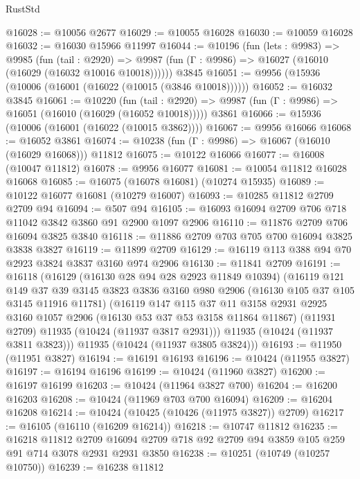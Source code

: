 \begin{lexlean}{RustStd}
\begin{coremodule}
@16028 := @10056 @2677
@16029 := @10055 @16028
@16030 := @10059 @16028
@16032 := @16030 @15966 @11997
@16044 := @10196
    (fun (lets : @9983) =>
    @9985
      (fun (tail : @2920) =>
      @9987 (fun (Γ : @9986) => @16027 (@16010 (@16029 (@16032 @10016 @10018))))))
    @3845
@16051 := @9956 (@15936 (@10006 (@16001 (@16022 (@10015 (@3846 @10018))))))
@16052 := @16032 @3845
@16061 := @10220
    (fun (tail : @2920) => @9987 (fun (Γ : @9986) => @16051 (@16010 (@16029 (@16052 @10018)))))
    @3861
@16066 := @15936 (@10006 (@16001 (@16022 (@10015 @3862))))
@16067 := @9956 @16066
@16068 := @16052 @3861
@16074 := @10238 (fun (Γ : @9986) => @16067 (@16010 (@16029 @16068))) @11812
@16075 := @10122 @16066
@16077 := @16008 (@10047 @11812)
@16078 := @9956 @16077
@16081 := @10054 @11812 @16028 @16068
@16085 := @16075 (@16078 @16081) (@10274 @15935)
@16089 := @10122 @16077 @16081 (@10279 @16007)
@16093 := @10285 @11812 @2709 @2709 @94
@16094 := @507 @94
@16105 := @16093 @16094 @2709 @706 @718 @11042 @3842 @3860 @91 @2900 @1097 @2906
@16110 := @11876 @2709 @706 @16094 @3825 @3840
@16118 := @11886 @2709 @703 @705 @700 @16094 @3825 @3838 @3827
@16119 := @11899 @2709
@16129 := @16119 @113 @388 @94 @70 @2923 @3824 @3837 @3160 @974 @2906
@16130 := @11841 @2709
@16191 := @16118
    (@16129
      (@16130 @28 @94 @28 @2923 @11849 @10394)
      (@16119
        @121
        @149
        @37
        @39
        @3145
        @3823
        @3836
        @3160
        @980
        @2906
        (@16130 @105 @37 @105 @3145 @11916 @11781)
        (@16119
          @147
          @115
          @37
          @11
          @3158
          @2931
          @2925
          @3160
          @1057
          @2906
          (@16130 @53 @37 @53 @3158 @11864 @11867)
          (@11931 @2709)
          @11935
          (@10424 (@11937 @3817 @2931)))
        @11935
        (@10424 (@11937 @3811 @3823)))
      @11935
      (@10424 (@11937 @3805 @3824)))
@16193 := @11950 (@11951 @3827)
@16194 := @16191 @16193
@16196 := @10424 (@11955 @3827)
@16197 := @16194 @16196
@16199 := @10424 (@11960 @3827)
@16200 := @16197 @16199
@16203 := @10424 (@11964 @3827 @700)
@16204 := @16200 @16203
@16208 := @10424 (@11969 @703 @700 @16094)
@16209 := @16204 @16208
@16214 := @10424 (@10425 (@10426 (@11975 @3827)) @2709)
@16217 := @16105 (@16110 (@16209 @16214))
@16218 := @10747 @11812
@16235 := @16218
    @11812
    @2709
    @16094
    @2709
    @718
    @92
    @2709
    @94
    @3859
    @105
    @259
    @91
    @714
    @3078
    @2931
    @2931
    @3850
@16238 := @10251 (@10749 (@10257 @10750))
@16239 := @16238 @11812

\end{coremodule}
\end{lexlean}
